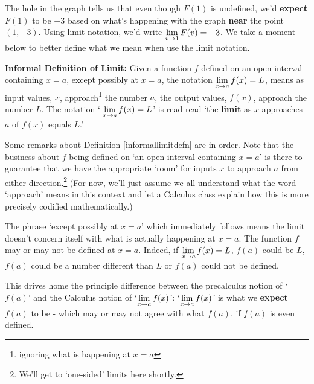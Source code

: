 \documentclass{ximera}
\begin{document}
The hole in the graph tells us that even though $F(1)$ is undefined, we'd \textbf{expect} $F(1)$ to be $-3$ based on what's happening with the graph \textbf{near} the point $(1,-3)$.  Using limit notation, we'd write  $\ds{\lim_{v \rightarrow 1} F(v) = -3}$.  We take a moment below to better define what we mean when use the limit notation.

\medskip


\begin{definition} \label{informallimitdefn} \textbf{Informal Definition of Limit:}  Given a function $f$ defined on an open interval containing $x=a$, except possibly at $x=a$, the notation $\ds{\lim_{x \rightarrow a} f(x) = L}$, means as input values, $x$, approach\footnote{ignoring what is happening at $x=a$} the number $a$, the output values, $f(x)$, approach the number $L$.  The notation ` $\ds{\lim_{x \rightarrow a} f(x) = L}$'  is read read `the \textbf{limit} as $x$ approaches $a$ of $f(x)$ equals $L$.' 
\end{definition}



\medskip


Some remarks about Definition \ref{informallimitdefn} are in order.  Note that the business about $f$ being defined on `an open interval containing $x=a$'  is there to guarantee that we have the appropriate `room' for inputs $x$ to approach $a$ from either direction.\footnote{We'll get to `one-sided' limits here shortly.}  (For now, we'll just assume we all understand what the word `approach' means in this context and let a Calculus class explain how this is more precisely codified mathematically.)

\medskip 

The phrase  `except possibly at $x=a$' which immediately follows means the limit doesn't concern itself with what is actually happening at $x=a$.  The function  $f$ may or may not be defined at $x = a$.  Indeed,  if  $\ds{\lim_{x \rightarrow a} f(x) = L}$, $f(a)$ could be $L$, $f(a)$  could be a number different than $L$ or $f(a)$ could not be defined. 

\medskip

 This drives home the principle difference between the precalculus notion of `$f(a)$' and the Calculus notion of  `$\ds{\lim_{x \rightarrow a} f(x)}$':  `$\ds{\lim_{x \rightarrow a} f(x)}$' is what we \textbf{expect} $f(a)$ to be - which may or may not agree with what $f(a)$, if $f(a)$ is even defined. 
\end{document}

